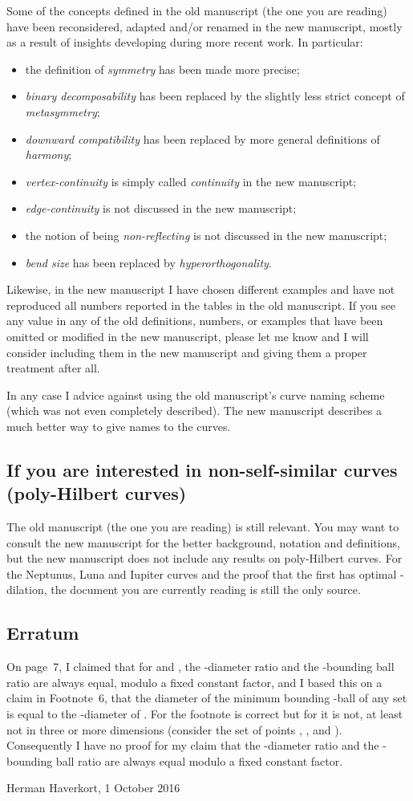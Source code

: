 \documentclass[11pt,a4paper]{article}
\begin{document}
Some of the concepts defined in the old manuscript (the one you are reading) have been reconsidered, adapted and/or renamed in the new manuscript, mostly as a result of insights developing during more recent work. In particular:\begin{itemize}
\item the definition of \emph{symmetry} has been made more precise;
\item \emph{binary decomposability} has been replaced by the slightly less strict concept of \emph{metasymmetry};
\item \emph{downward compatibility} has been replaced by more general definitions of \emph{harmony};
\item \emph{vertex-continuity} is simply called \emph{continuity} in the new manuscript;
\item \emph{edge-continuity} is not discussed in the new manuscript;
\item the notion of being \emph{non-reflecting} is not discussed in the new manuscript;
\item \emph{bend size} has been replaced by \emph{hyperorthogonality}.
\end{itemize}
Likewise, in the new manuscript I have chosen different examples and have not reproduced all numbers reported in the tables in the old manuscript. If you see any value in any of the old definitions, numbers, or examples that have been omitted or modified in the new manuscript, please let me know and I will consider including them in the new manuscript and giving them a proper treatment after all.

In any case I advice against using the old manuscript's curve naming scheme (which was not even completely described). The new manuscript describes a much better way to give names to the curves.

\subsection*{If you are interested in non-self-similar curves (poly-Hilbert curves)}
The old manuscript (the one you are reading) is still relevant. You may want to consult the new manuscript for the better background, notation and definitions, but the new manuscript does not include any results on poly-Hilbert curves. For the Neptunus, Luna and Iupiter curves and the proof that the first has optimal -dilation, the document you are currently reading is still the only source.

\subsection*{Erratum}
On page~7, I claimed that for  and , the -diameter ratio and the -bounding ball ratio are always equal, modulo a fixed constant factor, and I based this on a claim in Footnote~6, that the diameter of the minimum bounding -ball of any set  is equal to the -diameter of . For  the footnote is correct but for  it is not, at least not in three or more dimensions (consider the set of points , ,  and ). Consequently I have no proof for my claim that the -diameter ratio and the -bounding ball ratio are always equal modulo a fixed constant factor.

\addvspace\baselineskip
\raggedleft Herman Haverkort, 1 October 2016
\end{document}
